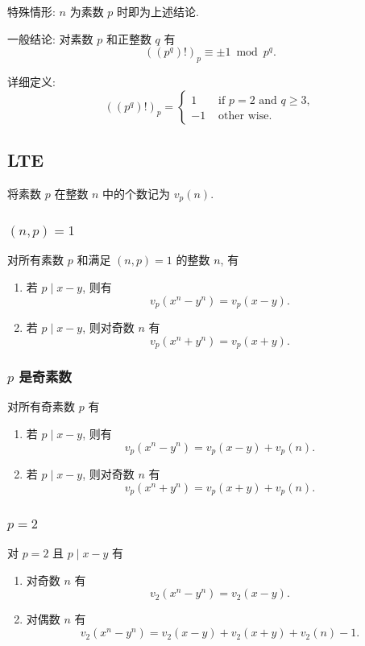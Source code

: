 \documentclass[UTF8, a4paper, titlepage, twoside]{ctexart}
\begin{document}
特殊情形: \(n\) 为素数 \(p\) 时即为上述结论.

一般结论: 对素数 \(p\) 和正整数 \(q\) 有 \[((p^q)!)_p \equiv \pm 1 \bmod p^q.\]

详细定义:
\[
    ((p^q)!)_p =
    \begin{cases}
        1  & \text { if } p=2 \text { and } q \geqslant 3, \\
        -1 & \text { other wise. }
    \end{cases}
\]

\subsection{ LTE }

将素数 $p$ 在整数 $n$ 中的个数记为 $v_p(n)$.

\subsubsection*{ \((n, p) = 1\) }

对所有素数 \(p\) 和满足 \((n, p) = 1\) 的整数 \(n\), 有
\begin{enumerate}
    \item 若 \(p \mid x - y\), 则有
          \[
              v_p(x^n - y^n) = v_p(x - y).
          \]
    \item 若 \(p \mid x - y\), 则对奇数 \(n\) 有
          \[
              v_p(x^n + y^n) = v_p(x + y).
          \]
\end{enumerate}

\subsubsection*{ \(p\) 是奇素数 }

对所有奇素数 \(p\) 有
\begin{enumerate}
    \item 若 \(p \mid x - y\), 则有
          \[
              v_p(x^n - y^n) = v_p(x - y) + v_p(n).
          \]
    \item 若 \(p \mid x - y\), 则对奇数 \(n\) 有
          \[
              v_p(x^n + y^n) = v_p(x + y) + v_p(n).
          \]
\end{enumerate}

\subsubsection*{ \(p = 2\) }

对 \(p = 2\) 且 \(p \mid x - y\) 有
\begin{enumerate}
    \item 对奇数 \(n\) 有
          \[
              v_2(x^n - y^n) = v_2(x - y).
          \]
    \item 对偶数 \(n\) 有
          \[
              v_2(x^n - y^n) = v_2(x - y) + v_2(x + y) + v_2(n) - 1.
          \]
\end{enumerate}
\end{document}
